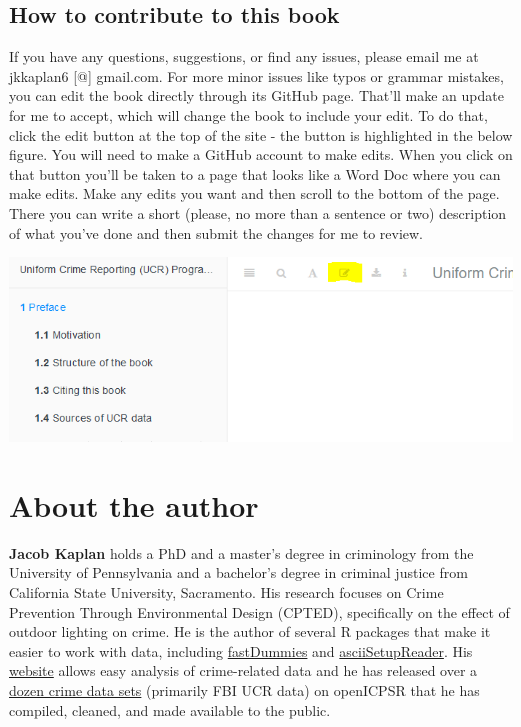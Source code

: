 \documentclass[
  12pt,
  openany]{book}
\begin{document}
\hypertarget{how-to-contribute-to-this-book}{%
\section{How to contribute to this book}\label{how-to-contribute-to-this-book}}

If you have any questions, suggestions, or find any issues, please email me at jkkaplan6 {[}@{]} gmail.com. For more minor issues like typos or grammar mistakes, you can edit the book directly through its GitHub page. That'll make an update for me to accept, which will change the book to include your edit. To do that, click the edit button at the top of the site - the button is highlighted in the below figure. You will need to make a GitHub account to make edits. When you click on that button you'll be taken to a page that looks like a Word Doc where you can make edits. Make any edits you want and then scroll to the bottom of the page. There you can write a short (please, no more than a sentence or two) description of what you've done and then submit the changes for me to review.

\includegraphics[width=9.61in]{images/edit_button}

\hypertarget{about-the-author}{%
\chapter*{About the author}\label{about-the-author}}


\textbf{Jacob Kaplan} holds a PhD and a master's degree in criminology from the University of Pennsylvania and a bachelor's degree in criminal justice from California State University, Sacramento. His research focuses on Crime Prevention Through Environmental Design (CPTED), specifically on the effect of outdoor lighting on crime. He is the author of several R packages that make it easier to work with data, including \href{https://jacobkap.github.io/fastDummies/}{fastDummies} and \href{https://jacobkap.github.io/asciiSetupReader/}{asciiSetupReader}. His \href{http://jacobdkaplan.com/}{website} allows easy analysis of crime-related data and he has released over a \href{http://jacobdkaplan.com/data.html}{dozen crime data sets} (primarily FBI UCR data) on openICPSR that he has compiled, cleaned, and made available to the public.
\end{document}
